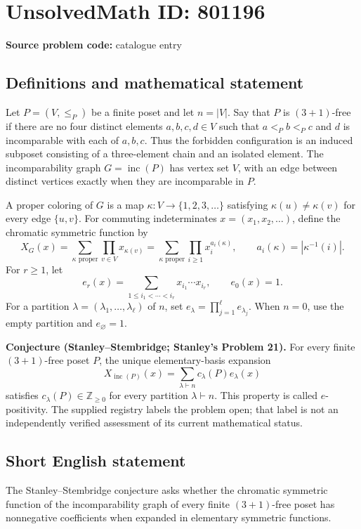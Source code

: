 \documentclass[11pt]{article}
\newcommand{\Z}{\mathbb{Z}}
\begin{document}
\section*{UnsolvedMath ID: 801196}
\textbf{Source problem code:} catalogue entry
\subsection{Definitions and mathematical statement}
Let \(P=(V,\leq_P)\) be a finite poset and let \(n=|V|\). Say that \(P\) is \((3+1)\)-free if there are no four distinct elements \(a,b,c,d\in V\) such that \(a<_P b<_P c\) and \(d\) is incomparable with each of \(a,b,c\). Thus the forbidden configuration is an induced subposet consisting of a three-element chain and an isolated element. The incomparability graph \(G=\operatorname{inc}(P)\) has vertex set \(V\), with an edge between distinct vertices exactly when they are incomparable in \(P\).

A proper coloring of \(G\) is a map \(\kappa:V\to\{1,2,3,\ldots\}\) satisfying \(\kappa(u)\ne\kappa(v)\) for every edge \(\{u,v\}\). For commuting indeterminates \(x=(x_1,x_2,\ldots)\), define the chromatic symmetric function by
\[
X_G(x)=\sum_{\kappa\text{ proper}}\prod_{v\in V}x_{\kappa(v)}
=\sum_{\kappa\text{ proper}}\prod_{i\geq1}x_i^{a_i(\kappa)},
\qquad a_i(\kappa)=|\kappa^{-1}(i)|.
\]
For \(r\geq1\), let
\[
e_r(x)=\sum_{1\leq i_1<\cdots<i_r}x_{i_1}\cdots x_{i_r},
\qquad e_0(x)=1.
\]
For a partition \(\lambda=(\lambda_1,\ldots,\lambda_\ell)\) of \(n\), set \(e_\lambda=\prod_{j=1}^{\ell}e_{\lambda_j}\). When \(n=0\), use the empty partition and \(e_{\varnothing}=1\).

\textbf{Conjecture (Stanley--Stembridge; Stanley's Problem 21).} For every finite \((3+1)\)-free poset \(P\), the unique elementary-basis expansion
\[
X_{\operatorname{inc}(P)}(x)=\sum_{\lambda\vdash n}c_\lambda(P)e_\lambda(x)
\]
satisfies \(c_\lambda(P)\in\Z_{\geq0}\) for every partition \(\lambda\vdash n\). This property is called \(e\)-positivity. The supplied registry labels the problem open; that label is not an independently verified assessment of its current mathematical status.
\subsection{Short English statement}
The Stanley--Stembridge conjecture asks whether the chromatic symmetric function of the incomparability graph of every finite \((3+1)\)-free poset has nonnegative coefficients when expanded in elementary symmetric functions.
\end{document}
